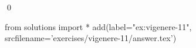 
\begin{ex} 
  \label{ex:vigenere-11}
  
  \qed
\end{ex} 
\begin{python0}
from solutions import *
add(label="ex:vigenere-11",
    srcfilename='exercises/vigenere-11/answer.tex') 
\end{python0}

